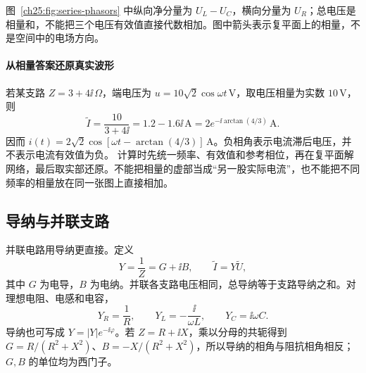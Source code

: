 \begin{center}
\begin{minipage}{0.78\linewidth}
\centering
{}
\end{minipage}
\end{center}
图~\ref{ch25:fig:series-phasors} 中纵向净分量为 $U_L-U_C$，横向分量为 $U_R$；总电压是相量和，不能把三个电压有效值直接代数相加。图中箭头表示复平面上的相量，不是空间中的电场方向。


\paragraph{从相量答案还原真实波形}
若某支路 $Z=3+4\ii\,\Omega$，端电压为 $u=10\sqrt2\cos\omega t\,\mathrm V$，取电压相量为实数 $10\,\mathrm V$，则
\[
 \widetilde I=\frac{10}{3+4\ii}=1.2-1.6\ii\,\mathrm A
 =2e^{-\ii\arctan(4/3)}\,\mathrm A.
\]
因而 $i(t)=2\sqrt2\cos[\omega t-\arctan(4/3)]\,\mathrm A$。负相角表示电流滞后电压，并不表示电流有效值为负。
计算时先统一频率、有效值和参考相位，再在复平面解网络，最后取实部还原。不能把相量的虚部当成“另一股实际电流”，也不能把不同频率的相量放在同一张图上直接相加。


\subsection{导纳与并联支路}


并联电路用导纳更直接。定义
\begin{equation}
 Y=\frac1Z=G+\ii B,
 \qquad \widetilde I=Y\widetilde U,
\end{equation}
其中 $G$ 为电导，$B$ 为电纳。并联各支路电压相同，总导纳等于支路导纳之和。对理想电阻、电感和电容，
\begin{equation}
 Y_R=\frac1R,
 \qquad Y_L=-\frac{\ii}{\omega L},
 \qquad Y_C=\ii\omega C.
\end{equation}
导纳也可写成 $Y=|Y|e^{-\ii\varphi}$。若 $Z=R+\ii X$，乘以分母的共轭得到
$G=R/(R^2+X^2)$、$B=-X/(R^2+X^2)$，所以导纳的相角与阻抗相角相反；$G,B$ 的单位均为西门子。

